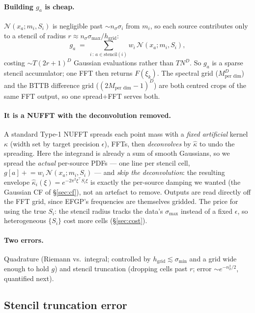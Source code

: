 \documentclass[11pt]{article}
\begin{document}
\paragraph{Building $g_a$ is cheap.}
$\mathcal{N}(x_a;m_i,S_i)$ is negligible past $\sim n_\sigma\sigma_i$
from $m_i$, so each source contributes only to a stencil of radius
$r\approx n_\sigma\sigma_{\max}/h_{\text{grid}}$:
\begin{equation}
g_a \;=\; \sum_{i\,:\,a\in\text{stencil}(i)} w_i\,\mathcal{N}(x_a;m_i,S_i),
\end{equation}
costing $\sim T(2r+1)^D$ Gaussian evaluations rather than $T N^D$.  So
$g_a$ is a sparse stencil accumulator; one FFT then returns $F(\xi_k)$.
The spectral grid ($M_{\text{per dim}}^D$) and the BTTB difference grid
($(2M_{\text{per dim}}-1)^D$) are both centred crops of the same FFT
output, so one spread+FFT serves both.

\paragraph{It is a NUFFT with the deconvolution removed.}
A standard Type-1 NUFFT spreads each point mass with a \emph{fixed
artificial} kernel $\kappa$ (width set by target precision $\epsilon$),
FFTs, then \emph{deconvolves} by $\hat\kappa$ to undo the spreading.
Here the integrand is already a sum of smooth Gaussians, so we spread
the \emph{actual} per-source PDFs --- one line per stencil cell,
$g[a]\mathrel{+}=w_i\,\mathcal{N}(x_a;m_i,S_i)$ --- and \emph{skip the
deconvolution}: the resulting envelope
$\hat\kappa_i(\xi)=e^{-2\pi^2\xi^\top S_i\xi}$ is exactly the per-source
damping we wanted (the Gaussian CF of \S\ref{sec:cf}), not an artefact
to remove.  Outputs are read directly off the FFT grid, since EFGP's
frequencies are themselves gridded.  The price for using the true
$S_i$: the stencil radius tracks the data's $\sigma_{\max}$ instead of
a fixed $\epsilon$, so heterogeneous $\{S_i\}$ cost more cells
(\S\ref{sec:cost}).

\paragraph{Two errors.}
Quadrature (Riemann vs.\ integral; controlled by
$h_{\text{grid}}\lesssim\sigma_{\min}$ and a grid wide enough to hold
$g$) and stencil truncation (dropping cells past $r$; error
$\sim e^{-n_\sigma^2/2}$, quantified next).

\subsection{Stencil truncation error}
\label{sec:trunc}
\end{document}
